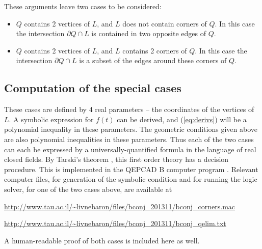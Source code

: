 \documentclass[a4paper,10pt,twoside,reqno,intlimits]{amsart}
\begin{document}
These arguments leave two cases to be considered:
\begin{itemize}
\item $Q$ contains 2 vertices of $L$, and $L$ does not contain corners of $Q$. In this case the
intersection ${\partial Q} \cap L$ is contained in two opposite edges of $Q$.
\item $Q$ contains 2 vertices of $L$, and $L$ contains 2 corners of $Q$. In this case the intersection
${\partial Q} \cap L$ is a subset of the edges around these corners of $Q$.
\end{itemize}

\subsection*{Computation of the special cases}

These cases are defined by 4 real parameters -- the coordinates of the vertices of $L$.
A symbolic expression for $f(t)$ can be derived, and (\ref{eq:derivs}) will be a polynomial inequality in
these parameters.
The geometric conditions given above are also polynomial inequalities in these parameters.
Thus each of the two cases can each be expressed by a universally-quantified formula in
the language of real closed fields.
By Tarski's theorem \cite{tarski}, this first order theory has a decision procedure.
This is implemented in the QEPCAD B computer program \cite{qepcad}.
Relevant computer files, for generation of the symbolic condition and for running the logic solver,
for one of the two cases above, are available at

{\smaller \url{http://www.tau.ac.il/~livnebaron/files/bconj_201311/bconj_corners.mac} }

{\smaller \url{http://www.tau.ac.il/~livnebaron/files/bconj_201311/bconj_qelim.txt} }

A human-readable proof of both cases is included here as well.
\end{document}

